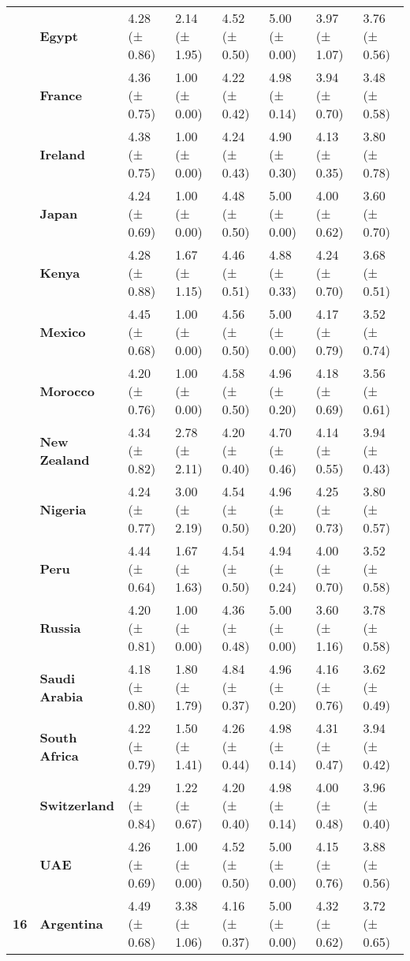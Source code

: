 \begin{tabular}{llllllll}
\textbf{} & \textbf{Egypt} & 4.28 (± 0.86) & 2.14 (± 1.95) & 4.52 (± 0.50) & 5.00 (± 0.00) & 3.97 (± 1.07) & 3.76 (± 0.56) \\
\textbf{} & \textbf{France} & 4.36 (± 0.75) & 1.00 (± 0.00) & 4.22 (± 0.42) & 4.98 (± 0.14) & 3.94 (± 0.70) & 3.48 (± 0.58) \\
\textbf{} & \textbf{Ireland} & 4.38 (± 0.75) & 1.00 (± 0.00) & 4.24 (± 0.43) & 4.90 (± 0.30) & 4.13 (± 0.35) & 3.80 (± 0.78) \\
\textbf{} & \textbf{Japan} & 4.24 (± 0.69) & 1.00 (± 0.00) & 4.48 (± 0.50) & 5.00 (± 0.00) & 4.00 (± 0.62) & 3.60 (± 0.70) \\
\textbf{} & \textbf{Kenya} & 4.28 (± 0.88) & 1.67 (± 1.15) & 4.46 (± 0.51) & 4.88 (± 0.33) & 4.24 (± 0.70) & 3.68 (± 0.51) \\
\textbf{} & \textbf{Mexico} & 4.45 (± 0.68) & 1.00 (± 0.00) & 4.56 (± 0.50) & 5.00 (± 0.00) & 4.17 (± 0.79) & 3.52 (± 0.74) \\
\textbf{} & \textbf{Morocco} & 4.20 (± 0.76) & 1.00 (± 0.00) & 4.58 (± 0.50) & 4.96 (± 0.20) & 4.18 (± 0.69) & 3.56 (± 0.61) \\
\textbf{} & \textbf{New Zealand} & 4.34 (± 0.82) & 2.78 (± 2.11) & 4.20 (± 0.40) & 4.70 (± 0.46) & 4.14 (± 0.55) & 3.94 (± 0.43) \\
\textbf{} & \textbf{Nigeria} & 4.24 (± 0.77) & 3.00 (± 2.19) & 4.54 (± 0.50) & 4.96 (± 0.20) & 4.25 (± 0.73) & 3.80 (± 0.57) \\
\textbf{} & \textbf{Peru} & 4.44 (± 0.64) & 1.67 (± 1.63) & 4.54 (± 0.50) & 4.94 (± 0.24) & 4.00 (± 0.70) & 3.52 (± 0.58) \\
\textbf{} & \textbf{Russia} & 4.20 (± 0.81) & 1.00 (± 0.00) & 4.36 (± 0.48) & 5.00 (± 0.00) & 3.60 (± 1.16) & 3.78 (± 0.58) \\
\textbf{} & \textbf{Saudi Arabia} & 4.18 (± 0.80) & 1.80 (± 1.79) & 4.84 (± 0.37) & 4.96 (± 0.20) & 4.16 (± 0.76) & 3.62 (± 0.49) \\
\textbf{} & \textbf{South Africa} & 4.22 (± 0.79) & 1.50 (± 1.41) & 4.26 (± 0.44) & 4.98 (± 0.14) & 4.31 (± 0.47) & 3.94 (± 0.42) \\
\textbf{} & \textbf{Switzerland} & 4.29 (± 0.84) & 1.22 (± 0.67) & 4.20 (± 0.40) & 4.98 (± 0.14) & 4.00 (± 0.48) & 3.96 (± 0.40) \\
\textbf{} & \textbf{UAE} & 4.26 (± 0.69) & 1.00 (± 0.00) & 4.52 (± 0.50) & 5.00 (± 0.00) & 4.15 (± 0.76) & 3.88 (± 0.56) \\
\cline{1-8}
\multirow[t]{19}{*}{\textbf{16}} & \textbf{Argentina} & 4.49 (± 0.68) & 3.38 (± 1.06) & 4.16 (± 0.37) & 5.00 (± 0.00) & 4.32 (± 0.62) & 3.72 (± 0.65) \\

\end{tabular}
